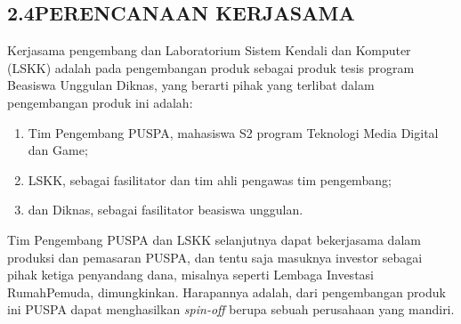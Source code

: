 \subsection*{\textsf{\normalsize 2.4\hspace{0.5cm}PERENCANAAN KERJASAMA}}

Kerjasama pengembang dan Laboratorium Sistem Kendali dan Komputer (LSKK) adalah pada pengembangan produk sebagai produk tesis program Beasiswa Unggulan Diknas, yang berarti pihak yang terlibat dalam pengembangan produk ini adalah:
\begin{enumerate}
	\item Tim Pengembang PUSPA, mahasiswa S2 program Teknologi Media Digital dan Game;
	\item LSKK, sebagai fasilitator dan tim ahli pengawas tim pengembang;
	\item dan Diknas, sebagai fasilitator beasiswa unggulan.
\end{enumerate}

Tim Pengembang PUSPA dan LSKK selanjutnya dapat bekerjasama dalam produksi dan pemasaran PUSPA, dan tentu saja masuknya investor sebagai pihak ketiga penyandang dana, misalnya seperti Lembaga Investasi RumahPemuda, dimungkinkan.
Harapannya adalah, dari pengembangan produk ini PUSPA dapat menghasilkan \textit{spin-off} berupa sebuah perusahaan yang mandiri.
 
